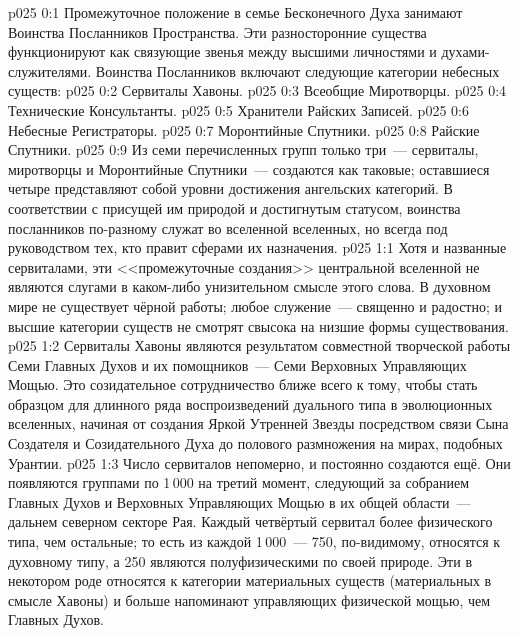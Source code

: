 \author{Высокоуполномоченный}
\vs p025 0:1 Промежуточное положение в семье Бесконечного Духа занимают Воинства Посланников Пространства. Эти разносторонние существа функционируют как связующие звенья между высшими личностями и духами\hyp{}служителями. Воинства Посланников включают следующие категории небесных существ:
\vs p025 0:2 Сервиталы Хавоны.
\vs p025 0:3 Всеобщие Миротворцы.
\vs p025 0:4 Технические Консультанты.
\vs p025 0:5 Хранители Райских Записей.
\vs p025 0:6 Небесные Регистраторы.
\vs p025 0:7 Моронтийные Спутники.
\vs p025 0:8 Райские Спутники.
\vs p025 0:9 \pc Из семи перечисленных групп только три~--- сервиталы, миротворцы и Моронтийные Спутники~--- создаются как таковые; оставшиеся четыре представляют собой уровни достижения ангельских категорий. В соответствии с присущей им природой и достигнутым статусом, воинства посланников по\hyp{}разному служат во вселенной вселенных, но всегда под руководством тех, кто правит сферами их назначения.
\vs p025 1:1 Хотя и названные сервиталами, эти <<промежуточные создания>> центральной вселенной не являются слугами в каком\hyp{}либо унизительном смысле этого слова. В духовном мире не существует чёрной работы; любое служение~--- священно и радостно; и высшие категории существ не смотрят свысока на низшие формы существования.
\vs p025 1:2 \pc Сервиталы Хавоны являются результатом совместной творческой работы Семи Главных Духов и их помощников~--- Семи Верховных Управляющих Мощью. Это созидательное сотрудничество ближе всего к тому, чтобы стать образцом для длинного ряда воспроизведений дуального типа в эволюционных вселенных, начиная от создания Яркой Утренней Звезды посредством связи Сына Создателя и Созидательного Духа до полового размножения на мирах, подобных Урантии.
\vs p025 1:3 Число сервиталов непомерно, и постоянно создаются ещё. Они появляются группами по 1\,000 на третий момент, следующий за собранием Главных Духов и Верховных Управляющих Мощью в их общей области~--- дальнем северном секторе Рая. Каждый четвёртый сервитал более физического типа, чем остальные; то есть из каждой 1\,000~--- 750, по\hyp{}видимому, относятся к духовному типу, а 250 являются полуфизическими по своей природе. Эти  в некотором роде относятся к категории материальных существ (материальных в смысле Хавоны) и больше напоминают управляющих физической мощью, чем Главных Духов.
